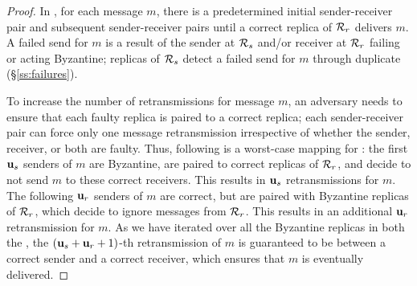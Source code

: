 \begin{proof}
    In \Scrooge{}, for each message $m$, there is a predetermined initial sender-receiver pair and 
    subsequent sender-receiver pairs until a correct replica of \RSM{} $\mathcal{R}_{r}$ delivers $m$.
    A failed send for $m$ is a result of the sender at $\mathcal{R}_{s}$ and/or receiver at $\mathcal{R}_{r}$ failing or acting Byzantine;
    replicas of \RSM{} $\mathcal{R}_{s}$ detect a failed send for $m$ through duplicate  (\S\ref{ss:failures}).

    To increase the number of retransmissions for message $m$, 
    an adversary needs to ensure that each faulty replica is paired to a correct replica; 
    each sender-receiver pair can force only one message retransmission irrespective of whether the sender, receiver, or both are faulty.
    Thus, following is a worst-case mapping for \Scrooge:  
    the first $\textbf{u}_{s}$ senders of $m$ are Byzantine, are paired to correct replicas of $\mathcal{R}_{r}$, and 
    decide to not send $m$ to these correct receivers.
    This results in $\textbf{u}_{s}$ retransmissions for $m$.
    The following $\textbf{u}_{r}$ senders of $m$ are correct, but are paired with Byzantine replicas of $\mathcal{R}_{r}$, which decide to 
    ignore messages from $\mathcal{R}_{r}$. 
    This results in an additional $\textbf{u}_{r}$ retransmission for $m$.
    As we have iterated over all the Byzantine replicas in both the , the $(\textbf{u}_{s}+\textbf{u}_{r}+1)$-th retransmission of $m$ is 
    guaranteed to be between a correct sender and a correct receiver, which
    ensures that $m$ is eventually delivered.
\end{proof}



